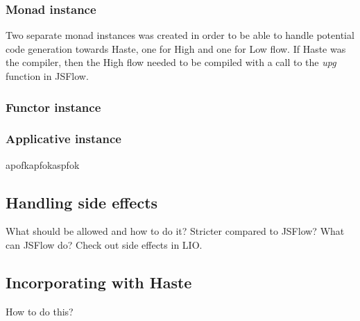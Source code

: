 \subsubsection{Monad instance}
Two separate monad instances was created in order to be able to handle potential code generation towards Haste, one for High and one for Low flow. If Haste was the compiler, then the High flow needed to be compiled with a call to the \emph{upg} function in JSFlow.
\subsubsection{Functor instance}

\subsubsection{Applicative instance}
apofkapfokaspfok

\subsection{Handling side effects}
What should be allowed and how to do it?
Stricter compared to JSFlow?
What can JSFlow do?
Check out side effects in LIO.

\subsection{Incorporating with Haste}
How to do this?
